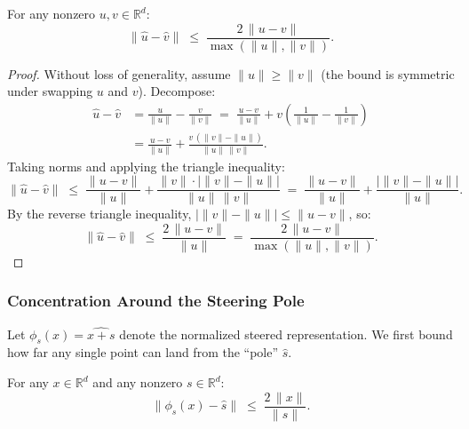 \begin{lemma}
\label{lem:chordal}
For any nonzero $u, v \in \mathbb{R}^d$:
%
\begin{equation}
  \|\hat{u} - \hat{v}\|
  \;\leq\;
  \frac{2\,\|u - v\|}{\max(\|u\|, \|v\|)}.
  \label{eq:chordal-bound}
\end{equation}
\end{lemma}

\begin{proof}
Without loss of generality, assume $\|u\| \geq \|v\|$
(the bound is symmetric under swapping $u$ and $v$).
Decompose:
%
\begin{align}
  \hat{u} - \hat{v}
  &= \frac{u}{\|u\|} - \frac{v}{\|v\|}
  \;=\; \frac{u - v}{\|u\|} + v\!\left(\frac{1}{\|u\|} - \frac{1}{\|v\|}\right)
  \label{eq:chordal-decomp}\\
  &= \frac{u - v}{\|u\|} + \frac{v\,(\|v\| - \|u\|)}{\|u\|\,\|v\|}.
  \label{eq:chordal-decomp2}
\end{align}
%
Taking norms and applying the triangle inequality:
%
\begin{equation}
  \|\hat{u} - \hat{v}\|
  \;\leq\;
  \frac{\|u - v\|}{\|u\|}
  + \frac{\|v\| \cdot \big|\|v\| - \|u\|\big|}{\|u\|\,\|v\|}
  \;=\;
  \frac{\|u - v\|}{\|u\|}
  + \frac{\big|\|v\| - \|u\|\big|}{\|u\|}.
  \label{eq:chordal-triangle}
\end{equation}
%
By the reverse triangle inequality, $\big|\|v\| - \|u\|\big| \leq \|u - v\|$, so:
%
\begin{equation}
  \|\hat{u} - \hat{v}\|
  \;\leq\;
  \frac{2\,\|u - v\|}{\|u\|}
  \;=\;
  \frac{2\,\|u - v\|}{\max(\|u\|, \|v\|)}.
  \label{eq:chordal-final}
\end{equation}
\end{proof}

\subsubsection{Concentration Around the Steering Pole}

Let $\phi_s(x) = \widehat{x + s}$ denote the normalized steered representation.
We first bound how far any single point can land from the ``pole'' $\hat{s}$.

\begin{proposition}
\label{prop:concentration}
For any $x \in \mathbb{R}^d$ and any nonzero $s \in \mathbb{R}^d$:
%
\begin{equation}
  \|\phi_s(x) - \hat{s}\|
  \;\leq\;
  \frac{2\,\|x\|}{\|s\|}.
  \label{eq:concentration}
\end{equation}
\end{proposition}

